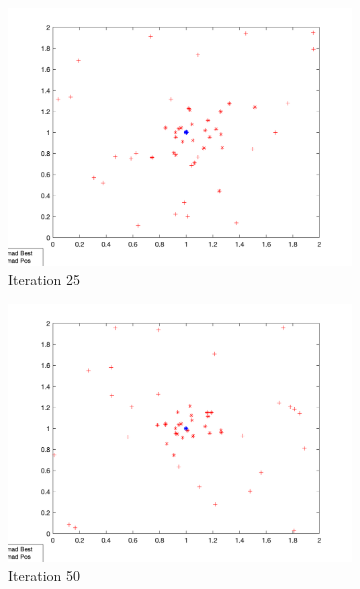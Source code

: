 \begin{figure}
  \centering
  \begin{subfigure}[b]{0.4\textwidth}
    \includegraphics[width=\textwidth]{img/roam/roam-iter-25}
    \caption{Iteration 25}
    \label{fig:roam-iter-0}
  \end{subfigure}
  \begin{subfigure}[b]{0.4\textwidth}
    \includegraphics[width=\textwidth]{img/roam/roam-iter-50}
    \caption{Iteration 50}
    \label{fig:roam-iter-1}
  \end{subfigure}
  \begin{subfigure}[b]{0.4\textwidth}

\end{subfigure}
\end{figure}
